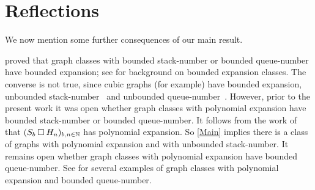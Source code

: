 \documentclass[kpfonts]{patmorin}
\newcommand{\CartProd}{\mathbin{\square}}
\begin{document}
\section{Reflections}

We now mention some further consequences of our main result. 

\citet{NOW11} proved that graph classes with bounded stack-number or bounded queue-number have bounded expansion; see \citep{Sparsity} for background on bounded expansion classes. The converse is not true, since cubic graphs (for example) have bounded expansion, unbounded stack-number~\citep{Malitz94a} and unbounded queue-number~\citep{Wood-QueueDegree}. However, prior to the present work it was open whether graph classes with polynomial expansion have bounded stack-number or bounded queue-number. It follows from the work of \citet[Theorem~19]{DHJLW20} that $(S_b \CartProd H_n)_{b,n\in\N}$ has polynomial expansion. So \cref{Main} implies there is a class of graphs with polynomial expansion and with unbounded stack-number. It remains open whether graph classes with polynomial expansion have bounded queue-number. See \citep{DJMMUW20,DMW} for several examples of graph classes with polynomial expansion and bounded queue-number.

\end{document}
